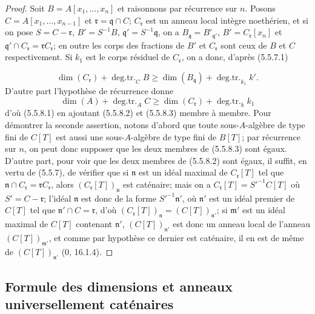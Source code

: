 \begin{proof}
Soit $B=A[x_1,\ldots,x_n]$ et raisonnons par récurrence sur $n$. Posons
$C=A[x_1,\ldots,x_{n-1}]$ et $\mathfrak r=\mathfrak q\cap C$;
$C_{\mathfrak r}$ est un anneau local intègre noethérien, et si on pose
$S=C-\mathfrak r$, $B'=S^{-1}B$, $\mathfrak q'=S^{-1}\mathfrak q$, on a
$B_{\mathfrak q}=B'_{\mathfrak q'}$, $B'=C_{\mathfrak r}[x_n]$ et
$\mathfrak q'\cap C_{\mathfrak r}=\mathfrak rC_{\mathfrak r}$; en outre les
corps des fractions de $B'$ et $C_{\mathfrak r}$ sont ceux de $B$ et $C$
respectivement. Si $k_1$ est le corps résiduel de $C_{\mathfrak r}$, on a
donc, d'après (5.5.7.1)


\begin{equation}
\dim(C_{\mathfrak r})+\operatorname{deg.tr.}_C B
\geq\dim(B_{\mathfrak q})+\operatorname{deg.tr.}_{k_1}k'.
\tag{5.5.8.2}\label{IV.2.s5.5.8.2-fr}
\end{equation}
D'autre part l'hypothèse de récurrence donne
\begin{equation}
\dim(A)+\operatorname{deg.tr.}_A C
\geq\dim(C_{\mathfrak r})+\operatorname{deg.tr.}_k k_1
\tag{5.5.8.3}\label{IV.2.s5.5.8.3-fr}
\end{equation}
d'où (5.5.8.1) en ajoutant (5.5.8.2) et (5.5.8.3) membre à membre. Pour
démontrer la seconde assertion, notons d'abord que toute sous-$A$-algèbre de
type fini de $C[T]$ est aussi une sous-$A$-algèbre de type fini de $B[T]$;
par récurrence sur $n$, on peut donc supposer que les deux membres de
(5.5.8.3) sont égaux. D'autre part, pour voir que les deux membres de
(5.5.8.2) sont égaux, il suffit, en vertu de (5.5.7), de vérifier que si
$\mathfrak n$ est un idéal maximal de $C_{\mathfrak r}[T]$ tel que
$\mathfrak n\cap C_{\mathfrak r}=\mathfrak rC_{\mathfrak r}$, alors
$(C_{\mathfrak r}[T])_{\mathfrak n}$ est caténaire; mais on a
$C_{\mathfrak r}[T]=S'^{-1}C[T]$ où $S'=C-\mathfrak r$; l'idéal
$\mathfrak n$ est donc de la forme $S'^{-1}\mathfrak n'$, où $\mathfrak n'$
est un idéal premier de $C[T]$ tel que $\mathfrak n'\cap C=\mathfrak r$,
d'où $(C_{\mathfrak r}[T])_{\mathfrak n}=(C[T])_{\mathfrak n'}$; si
$\mathfrak m'$ est un idéal maximal de $C[T]$ contenant $\mathfrak n'$,
$(C[T])_{\mathfrak n'}$ est donc un anneau local de l'anneau
$(C[T])_{\mathfrak m'}$, et comme par hypothèse ce dernier est caténaire, il
en est de même de $(C[T])_{\mathfrak n'}$ (0, 16.1.4).
\end{proof}

\subsection{Formule des dimensions et anneaux universellement caténaires}
\label{IV.2.s5.6-fr}

